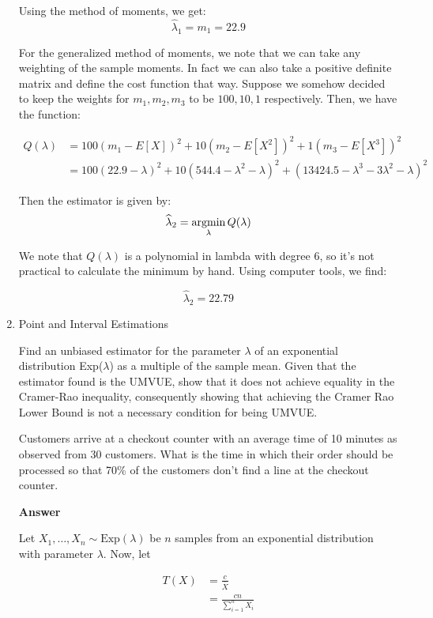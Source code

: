 \documentclass[12pt, oneside]{article}
\newcommand{\argmin}{\operatornamewithlimits{argmin}}
\begin{document}
\begin{enumerate}
{  Using the method of moments, we get:
  \[\widehat{\lambda}_1 = m_1 = 22.9\]

  For the generalized method of moments, we note that we can take any weighting of the
  sample moments. In fact we can also take a positive definite matrix and define the
  cost function that way. Suppose we somehow decided to keep the weights for \(m_1, m_2, m_3\)
  to be \(100, 10, 1\) respectively. Then, we have the function:

  \begin{align*}
    Q(\lambda) &= 100(m_1 - E[X])^2 + 10(m_2 - E[X^2])^2 + 1(m_3 - E[X^3])^2 \\
               &= 100(22.9 - \lambda)^2 + 10(544.4 - \lambda^2 - \lambda)^2 + (13424.5 - \lambda^3 - 3\lambda^2 - \lambda)^2
  \end{align*}

  Then the estimator is given by:
  \[\widehat{\lambda}_2 = \argmin_\lambda{Q(\lambda)}\]

  We note that \(Q(\lambda)\) is a polynomial in lambda with degree 6, so it's not practical
  to calculate the minimum by hand. Using computer tools, we find:

  \[\widehat{\lambda}_2 = 22.79\]
}


\item	{
  Point and Interval Estimations

  Find an unbiased estimator for the parameter \(\lambda\) of an exponential 
  distribution Exp(\(\lambda\)) as a multiple of the sample mean. Given that the
  estimator found is the UMVUE, show that it does not achieve
  equality in the Cramer-Rao inequality, consequently showing that achieving the
  Cramer Rao Lower Bound is not a necessary condition for being UMVUE.

  Customers arrive at a checkout counter with an average time of 10 minutes as observed
  from 30 customers.
  What is the time in which their order should be processed so that 70\% of the customers
  don't find a line at the checkout counter.
  
  \textbf{Answer}

  Let \(X_1, \ldots, X_n \sim \text{Exp}(\lambda)\) be \(n\) samples from an exponential
  distribution with parameter \(\lambda\). Now, let

  \begin{align*}
    T(X) &= \frac{c}{\overline{X}} \\
         &= \frac{cn}{\sum_{i=1}^{n} X_i}
  \end{align*}

}
\end{enumerate}
\end{document}
